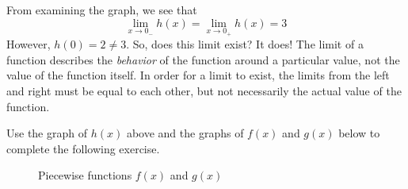From examining the graph, we see that $$\lim_{x\to0_-}h(x) = \lim_{x\to0_+}h(x) = 3$$
However, $h(0) = 2 \neq 3$. So, does this limit exist? It does! The limit of a 
function describes the \textit{behavior} of the function around a particular value, 
not the value of the function itself. In order for a limit to exist, the limits 
from the left and right must be equal to each other, but not necessarily the actual 
value of the function. 

Use the graph of $h(x)$ above and the graphs of $f(x)$ and $g(x)$ below to complete 
the following exercise.
\begin{figure}[htbp]
\centering
{}
\caption{Piecewise functions $f(x)$ and $g(x)$}
\end{figure}

